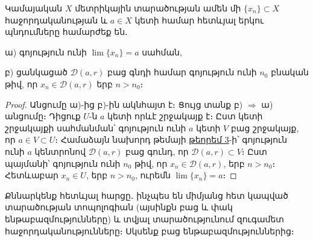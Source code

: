 \documentclass[./main.tex]{subfiles}
\begin{document}
\begin{theorem}\label{ch10thm1}
Կամայական $X$ մետրիկային տարածության ամեն մի $\{x_n\} \subset X$ հաջորդականության և $a \in X$ կետի համար հետևյալ երկու պնդումները համարժեք են․
\par ա) գոյություն ունի $\lim\{x_n\}=a$ սահման,
\par բ) ցանկացած $\mathcal{D}(a,r)$ բաց գնդի համար գոյություն ունի $n_0$ բնական թիվ, որ $x_n \in \mathcal{D}(a,r)$ երբ $n>n_0$։
\end{theorem}
\begin{proof}
\par Անցումը ա)-ից բ)-ին ակնհայտ է։ Ցույց տանք բ) $\Rightarrow$ ա) անցումը։ Դիցուք $U$-ն $a$ կետի որևէ շրջակայք է։ Ըստ կետի շրջակայքի սահմանման՝ գոյու\-թ\-յուն ունի $a$ կետի $V$ բաց շրջակայք, որ $a \in V \subset U$։ Համաձայն նախորդ թեմայի \hyperref[ch9thm3]{թեորեմ 3}-ի՝ գոյություն ունի $a$ կենտրոնով $\mathcal{D}(a,r)$ բաց գունդ, որ $\mathcal{D}(a,r) \subset V$։ Ըստ պայմանի՝ գոյություն ունի $n_0$ թիվ, որ $x_n \in \mathcal{D}(a,r)$, երբ $n>n_0$։ Հետևաբար $x_n \in U$, երբ $n>n_0$, ուրեմն $\lim\{x_n\} = a$։
\end{proof}

\par Քննարկենք հետևյալ հարցը․ ինչպես են միմյանց հետ կապված տարածութ\-յան տոպոլոգիան (այսինքն բաց և փակ ենթաբազմությունները) և տվյալ տարածութ\-յունում զուգամետ հաջորդականությունները։ Սկսենք բաց ենթաբազմություններից։
\end{document}
